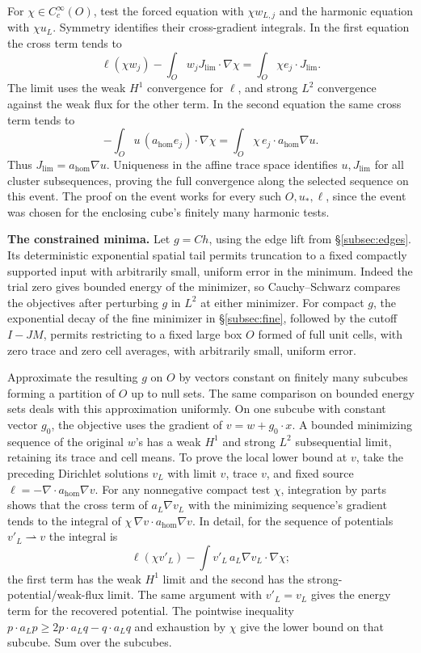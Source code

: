 \documentclass[11pt]{article}
\begin{document}
For \(\chi\in C_c^\infty(O)\), test the forced equation with \(\chi w_{L,j}\) and the harmonic equation with \(\chi u_L\). Symmetry identifies their cross-gradient integrals. In the first equation the cross term tends to \[
 \ell(\chi w_j)-\int_O w_j J_{\mathrm{lim}}\cdot\nabla\chi
    =\int_O\chi e_j\cdot J_{\mathrm{lim}} .
\] The limit uses the weak \(H^1\) convergence for \(\ell\), and strong \(L^2\) convergence against the weak flux for the other term. In the second equation the same cross term tends to \[
 -\int_O u\, (a_{\mathrm{hom}}e_j)\cdot\nabla\chi
    =\int_O\chi\, e_j\cdot a_{\mathrm{hom}}\nabla u .
\] Thus \(J_{\mathrm{lim}}=a_{\mathrm{hom}}\nabla u\). Uniqueness in the affine trace space identifies \(u,J_{\mathrm{lim}}\) for all cluster subsequences, proving the full convergence along the selected sequence on this event. The proof on the event works for every such \(O,u_*,\ell\), since the event was chosen for the enclosing cube's finitely many harmonic tests.

\textbf{The constrained minima.} Let \(g=Ch\), using the edge lift from \S\ref{subsec:edges}. Its deterministic exponential spatial tail permits truncation to a fixed compactly supported input with arbitrarily small, uniform error in the minimum. Indeed the trial zero gives bounded energy of the minimizer, so Cauchy--Schwarz compares the objectives after perturbing \(g\) in \(L^2\) at either minimizer. For compact \(g\), the exponential decay of the fine minimizer in \S\ref{subsec:fine}, followed by the cutoff \(I-JM\), permits restricting to a fixed large box \(O\) formed of full unit cells, with zero trace and zero cell averages, with arbitrarily small, uniform error.

Approximate the resulting \(g\) on \(O\) by vectors constant on finitely many subcubes forming a partition of \(O\) up to null sets. The same comparison on bounded energy sets deals with this approximation uniformly. On one subcube with constant vector \(g_0\), the objective uses the gradient of \(v=w+g_0\cdot x\). A bounded minimizing sequence of the original \(w\)'s has a weak \(H^1\) and strong \(L^2\) subsequential limit, retaining its trace and cell means. To prove the local lower bound at \(v\), take the preceding Dirichlet solutions \(v_L\) with limit \(v\), trace \(v\), and fixed source \(\ell=-\nabla\cdot a_{\mathrm{hom}}\nabla v\). For any nonnegative compact test \(\chi\), integration by parts shows that the cross term of \(a_L\nabla v_L\) with the minimizing sequence's gradient tends to the integral of \(\chi\,\nabla v\cdot a_{\mathrm{hom}}\nabla v\). In detail, for the sequence of potentials \(v'_L\rightharpoonup v\) the integral is \[
 \ell(\chi v'_L)-\int v'_L\,a_L\nabla v_L\cdot\nabla\chi ;
\] the first term has the weak \(H^1\) limit and the second has the strong-potential/weak-flux limit. The same argument with \(v'_L=v_L\) gives the energy term for the recovered potential. The pointwise inequality \(p\cdot a_Lp\ge2p\cdot a_Lq-q\cdot a_Lq\) and exhaustion by \(\chi\) give the lower bound on that subcube. Sum over the subcubes.
\end{document}
